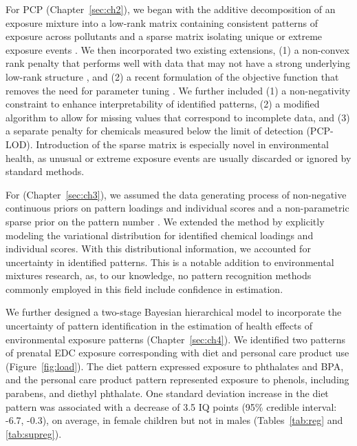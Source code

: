 For PCP (Chapter~\ref{sec:ch2}), we began with the additive decomposition of an exposure mixture into a low-rank matrix containing consistent patterns of exposure across pollutants and a sparse matrix isolating unique or extreme exposure events \cite{candes2011robust, zhou2010stable}. We then incorporated two existing extensions, (1) a non-convex rank penalty that performs well with data that may not have a strong underlying low-rank structure \cite{netrapalli2014non, chen2020bridging}, and (2) a recent formulation of the objective function that removes the need for parameter tuning \cite{cite_zhang}. We further included (1) a non-negativity constraint to enhance interpretability of identified patterns, (2) a modified algorithm to allow for missing values that correspond to incomplete data, and (3) a separate penalty for chemicals measured below the limit of detection (PCP-LOD). Introduction of the sparse matrix is especially novel in environmental health, as unusual or extreme exposure events are usually discarded or ignored by standard methods.

For \bnmfc (Chapter~\ref{sec:ch3}), we assumed the data generating process of non-negative continuous priors on pattern loadings and individual scores and a non-parametric sparse prior on the pattern number \cite{holtzman2018machine}. We extended the method by explicitly modeling the variational distribution for identified chemical loadings and individual scores. With this distributional information, we accounted for uncertainty in identified patterns. This is a notable addition to environmental mixtures research, as, to our knowledge, no pattern recognition methods commonly employed in this field include confidence in estimation.

We further designed a two-stage Bayesian hierarchical model to incorporate the uncertainty of pattern identification in the estimation of health effects of environmental exposure patterns (Chapter~\ref{sec:ch4}). We identified two patterns of prenatal EDC exposure corresponding with diet and personal care product use (Figure~\ref{fig:load}). The diet pattern expressed exposure to phthalates and BPA, and the personal care product pattern represented exposure to phenols, including parabens, and diethyl phthalate. One standard deviation increase in the diet pattern was associated with a decrease of 3.5 IQ points (95\% credible interval: -6.7, -0.3), on average, in female children but not in males (Tables~\ref{tab:reg} and \ref{tab:supreg}).


